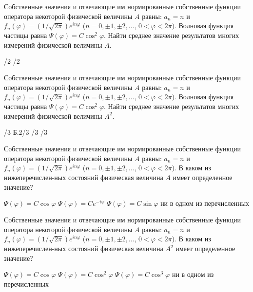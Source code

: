 \documentclass[11pt,a4paper]{exam}
\begin{document}
\begin{questions}
\question Собственные значения и отвечающие им нормированные собственные функции оператора некоторой физической величины $A$ равны: ${a_n} = n$ и ${f_n}(\varphi ) = \left( {1/\sqrt {2\pi } } \right){e^{in\varphi }}$ ($n = 0, \pm 1, \pm 2,...$, $0 < \varphi  < 2\pi $). Волновая функция частицы равна $\Psi (\varphi ) = C{\cos ^2}\varphi $. Найти среднее значение результатов многих измерений физической величины $A$. 
\begin{choices}
/2      
/2       
\end{choices}

\question Собственные значения и отвечающие им нормированные собственные функции оператора некоторой физической величины $A$ равны: ${a_n} = n$ и ${f_n}(\varphi ) = \left( {1/\sqrt {2\pi } } \right){e^{in\varphi }}$ ($n = 0, \pm 1, \pm 2,...$, $0 < \varphi  < 2\pi $). Волновая функция частицы равна $\Psi (\varphi ) = C{\cos ^2}\varphi $. Найти среднее значение результатов многих измерений физической величины ${A^2}$. 
\begin{choices}
/3    Б.2/3    
/3       
/3 
\end{choices}

\question Собственные значения и отвечающие им нормированные собственные функции оператора некоторой физической величины $A$ равны: ${a_n} = n$ и ${f_n}(\varphi ) = \left( {1/\sqrt {2\pi } } \right){e^{in\varphi }}$ ($n = 0, \pm 1, \pm 2,...$, $0 < \varphi  < 2\pi $). В каком из нижеперечислен-ных состояний физическая величина $A$ имеет определенное значение? 
\begin{choices}
\choice $\Psi (\varphi ) = C\cos \varphi $         
\choice $\Psi (\varphi ) = C{e^{ - i\varphi }}$
\choice $\Psi (\varphi ) = C\sin \varphi $         
\choice ни в одном из перечисленных
\end{choices}

\question Собственные значения и отвечающие им нормированные собственные функции оператора некоторой физической величины $A$ равны: ${a_n} = n$ и ${f_n}(\varphi ) = \left( {1/\sqrt {2\pi } } \right){e^{in\varphi }}$ ($n = 0, \pm 1, \pm 2,...$, $0 < \varphi  < 2\pi $). В каком из нижеперечислен-ных состояний физическая величина ${A^2}$ имеет определенное значение? 
\begin{choices}
\choice $\Psi (\varphi ) = C\cos \varphi $         
\choice $\Psi (\varphi ) = C{\cos ^2}\varphi $
\choice $\Psi (\varphi ) = C{\cos ^3}\varphi $        
\choice ни в одном из перечисленных
\end{choices}


\end{questions}
\end{document}
